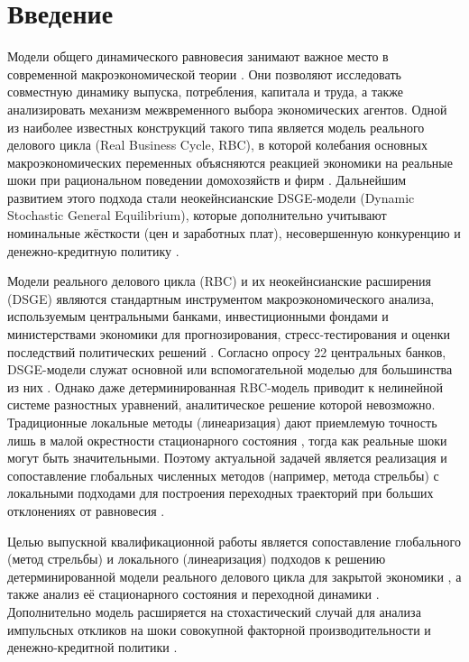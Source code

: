 \section*{Введение}

Модели общего динамического равновесия занимают важное место в современной макроэкономической теории \cite{heermaussner2009dynamic}. Они позволяют исследовать совместную динамику выпуска, потребления, капитала и труда, а также анализировать механизм межвременного выбора экономических агентов. Одной из наиболее известных конструкций такого типа является модель реального делового цикла (Real Business Cycle, RBC), в которой колебания основных макроэкономических переменных объясняются реакцией экономики на реальные шоки при рациональном поведении домохозяйств и фирм \cite{kydland1982time}. Дальнейшим развитием этого подхода стали неокейнсианские DSGE-модели (Dynamic Stochastic General Equilibrium), которые дополнительно учитывают номинальные жёсткости (цен и заработных плат), несовершенную конкуренцию и денежно-кредитную политику \cite{smets2007shocks, christiano2005nominal}.

Модели реального делового цикла (RBC) и их неокейнсианские расширения (DSGE) являются стандартным инструментом макроэкономического анализа, используемым центральными банками, инвестиционными фондами и министерствами экономики для прогнозирования, стресс-тестирования и оценки последствий политических решений \cite{motto2025chapter, ristiniemi2025chapter}. Согласно опросу 22 центральных банков, DSGE-модели служат основной или вспомогательной моделью для большинства из них \cite{zamrazilova2025role}. Однако даже детерминированная RBC-модель приводит к нелинейной системе разностных уравнений, аналитическое решение которой невозможно. Традиционные локальные методы (линеаризация) дают приемлемую точность лишь в малой окрестности стационарного состояния \cite{judd1998numerical}, тогда как реальные шоки могут быть значительными. Поэтому актуальной задачей является реализация и сопоставление глобальных численных методов (например, метода стрельбы) с локальными подходами для построения переходных траекторий при больших отклонениях от равновесия \cite{lipton1983multiple}.

Целью выпускной квалификационной работы является сопоставление глобального (метод стрельбы) и локального (линеаризация) подходов к решению детерминированной модели реального делового цикла для закрытой экономики \cite{judd1998numerical}, а также анализ её стационарного состояния и переходной динамики \cite{heermaussner2009dynamic}. Дополнительно модель расширяется на стохастический случай для анализа импульсных откликов на шоки совокупной факторной производительности и денежно-кредитной политики \cite{sims2002solving, blanchardkahn1980}.

